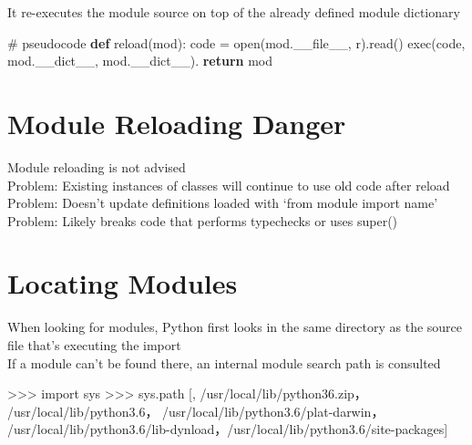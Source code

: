 \documentclass[
  letterpaper,
  DIV=11,
  numbers=noendperiod]{scrreprt}
\newenvironment{Shaded}{\begin{snugshade}}{\end{snugshade}}
\newcommand{\BuiltInTok}[1]{\textcolor[rgb]{0.00,0.23,0.31}{#1}}
\newcommand{\CommentTok}[1]{\textcolor[rgb]{0.37,0.37,0.37}{#1}}
\newcommand{\ControlFlowTok}[1]{\textcolor[rgb]{0.00,0.23,0.31}{\textbf{#1}}}
\newcommand{\KeywordTok}[1]{\textcolor[rgb]{0.00,0.23,0.31}{\textbf{#1}}}
\newcommand{\NormalTok}[1]{\textcolor[rgb]{0.00,0.23,0.31}{#1}}
\newcommand{\OperatorTok}[1]{\textcolor[rgb]{0.37,0.37,0.37}{#1}}
\newcommand{\StringTok}[1]{\textcolor[rgb]{0.13,0.47,0.30}{#1}}
\newcommand{\VariableTok}[1]{\textcolor[rgb]{0.07,0.07,0.07}{#1}}
\begin{document}
It re-executes the module source on top of the already defined module
dictionary

\begin{Shaded}
\begin{Highlighting}[]
\CommentTok{\# pseudocode}
\KeywordTok{def} \BuiltInTok{reload}\NormalTok{(mod):}
\NormalTok{    code }\OperatorTok{=} \BuiltInTok{open}\NormalTok{(mod.}\VariableTok{\_\_file\_\_}\NormalTok{, }\StringTok{\textquotesingle{}r\textquotesingle{}}\NormalTok{).read()}
    \BuiltInTok{exec}\NormalTok{(code, mod.\_\_dict\_\_, mod.\_\_dict\_\_).}
\ControlFlowTok{return}\NormalTok{ mod }
\end{Highlighting}
\end{Shaded}


\chapter{Module Reloading Danger}\label{module-reloading-danger}

Module reloading is not advised\\
Problem: Existing instances of classes will continue to use old code
after reload\\
Problem: Doesn't update definitions loaded with `from module import
name'\\
Problem: Likely breaks code that performs typechecks or uses super()


\chapter{Locating Modules}\label{locating-modules-1}

When looking for modules, Python first looks in the same directory as
the source file that's executing the import\\
If a module can't be found there, an internal module search path is
consulted

\begin{Shaded}
\begin{Highlighting}[]
\NormalTok{\textgreater{}\textgreater{}\textgreater{} import sys   }
\NormalTok{\textgreater{}\textgreater{}\textgreater{} sys.path   }
\NormalTok{[\textquotesingle{}\textquotesingle{}, \textquotesingle{}/usr/local/lib/python36.zip\textquotesingle{}， \textquotesingle{}/usr/local/lib/python3.6\textquotesingle{}， \textquotesingle{}/usr/local/lib/python3.6/plat{-}darwin\textquotesingle{}， \textquotesingle{}/usr/local/lib/python3.6/lib{-}dynload\textquotesingle{}，\textquotesingle{}/usr/local/lib/python3.6/site{-}packages\textquotesingle{}]}
\end{Highlighting}
\end{Shaded}
\end{document}
